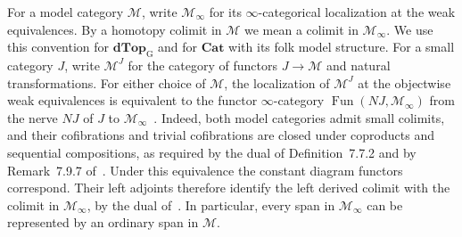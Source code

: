 \documentclass[12pt,a4paper]{amsart}
\theoremstyle{definition}
\newcommand{\D}{\mathbf{dTop}}
\newcommand{\Cat}{\mathbf{Cat}}
\newcommand{\MG}{\D_{\mathrm G}}
\begin{document}
For a model category $\mathcal M$, write $\mathcal M_\infty$ for its $\infty$-categorical localization at the weak equivalences. By a homotopy colimit in $\mathcal M$ we mean a colimit in $\mathcal M_\infty$. We use this convention for $\MG$ and for $\Cat$ with its folk model structure. For a small category $J$, write $\mathcal M^J$ for the category of functors $J\to\mathcal M$ and natural transformations. For either choice of $\mathcal M$, the localization of $\mathcal M^J$ at the objectwise weak equivalences is equivalent to the functor $\infty$-category $\operatorname{Fun}(NJ,\mathcal M_\infty)$ from the nerve $NJ$ of $J$ to $\mathcal M_\infty$~\cite[Theorem~7.9.8]{Cisinski2019Higher}. Indeed, both model categories admit small colimits, and their cofibrations and trivial cofibrations are closed under coproducts and sequential compositions, as required by the dual of Definition~7.7.2 and by Remark~7.9.7 of~\cite{Cisinski2019Higher}. Under this equivalence the constant diagram functors correspond. Their left adjoints therefore identify the left derived colimit with the colimit in $\mathcal M_\infty$, by the dual of~\cite[Remark~7.9.10]{Cisinski2019Higher}. In particular, every span in $\mathcal M_\infty$ can be represented by an ordinary span in $\mathcal M$.
\end{document}
